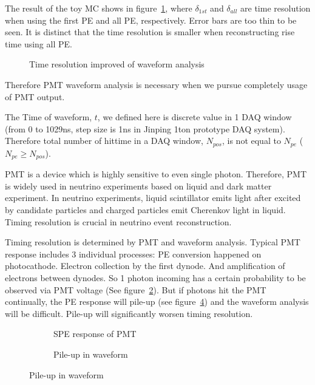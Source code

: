 The result of the toy MC shows in figure~\ref{fig:reso-diff}, where $\delta_{1st}$ and $\delta_{all}$ are time resolution when using the first PE and all PE, respectively. Error bars are too thin to be seen. It is distinct that the time resolution is smaller when reconstructing rise time using all PE. 

\begin{figure}[H]
    \centering
    \scalebox{0.7}{}
    \caption{\label{fig:reso-diff} Time resolution improved of waveform analysis}
\end{figure}

Therefore PMT waveform analysis is necessary when we pursue completely usage of PMT output. 

The Time of waveform, $t$, we defined here is discrete value in 1 DAQ window (from 0 to 1029ns, step size is 1ns in Jinping 1ton prototype DAQ system). Therefore total number of hittime in a DAQ window, $N_{pos}$, is not equal to $N_{pe}$ ($N_{pe} \geq N_{pos}$). 

PMT is a device which is highly sensitive to even single photon. Therefore, PMT is widely used in neutrino experiments based on liquid and dark matter experiment. In neutrino experiments, liquid scintillator emits light after excited by candidate particles and charged particles emit Cherenkov light in liquid. Timing resolution is crucial in neutrino event reconstruction. 

Timing resolution is determined by PMT and waveform analysis. Typical PMT response includes 3 individual processes: PE conversion happened on photocathode. Electron collection by the first dynode. And amplification of electrons between dynodes. So 1 photon incoming has a certain probability to be observed via PMT voltage (See figure~\ref{fig:spe}). But if photons hit the PMT continually, the PE response will pile-up (see figure~\ref{fig:pile}) and the waveform analysis will be difficult. Pile-up will significantly worsen timing resolution. 

\begin{figure}[H]
\begin{minipage}[b]{.5\textwidth}
\begin{figure}[H]
    \centering
    \resizebox{\textwidth}{!}{}
    \caption{\label{fig:spe} SPE response of PMT}
\end{figure}
\end{minipage}
\begin{minipage}[b]{.5\textwidth}
\begin{figure}[H]
    \centering
    \resizebox{\textwidth}{!}{}
    \caption{\label{fig:pile} Pile-up in waveform}
\end{figure}
\end{minipage}
\end{figure}

